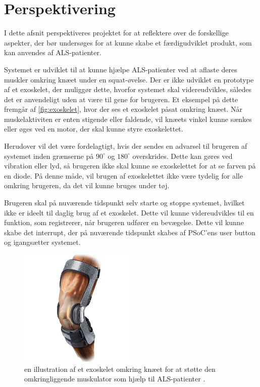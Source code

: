 \section{Perspektivering} \label{perspektivering}
I dette afsnit perspektiveres projektet for at reflektere over de forskellige aspekter, der bør undersøges for at kunne skabe et færdigudviklet produkt, som kan anvendes af ALS-patienter. 

Systemet er udviklet til at kunne hjælpe ALS-patienter ved at aflaste deres muskler omkring knæet under en squat-øvelse. Der er ikke udviklet en prototype af et exoskelet, der muliggør dette, hvorfor systemet skal videreudvikles, således det er anvendeligt uden at være til gene for brugeren. Et eksempel på dette fremgår af \autoref{fig:exoskelet}, hvor der ses et exoskelet påsat omkring knæet. Når muskelaktiviten er enten stigende eller faldende, vil knæets vinkel kunne sænkes eller øges ved en motor, der skal kunne styre exoskelettet.

Herudover vil det være fordelagtigt, hvis der sendes en advarsel til brugeren af systemet inden grænserne på $90^{\circ}$ og $180^{\circ}$ overskrides. Dette kan gøres ved vibration eller lyd, så brugeren ikke skal kunne se exoskelettet for at se farven på en diode. På denne måde, vil brugen af exoskelettet ikke være tydelig for alle omkring brugeren, da det vil kunne bruges under tøj.

Brugeren skal på nuværende tidspunkt selv starte og stoppe systemet, hvilket ikke er ideelt til daglig brug af et exoskelet. Dette vil kunne videreudvikles til en funktion, som registrerer, når brugeren udfører en bevægelse. Dette vil kunne skabe det interrupt, der på nuværende tidspunkt skabes af PSoC'ens user button og igangsætter systemet. 

\begin{figure}[H]
\centering
\includegraphics[width=0.5\textwidth]{figures/exoskelet}
\caption{en illustration af et exoskelet omkring knæet for at støtte den omkringliggende muskulator som hjælp til ALS-patienter \citep{djo}.}
\label{fig:exoskelet}
\end{figure}

